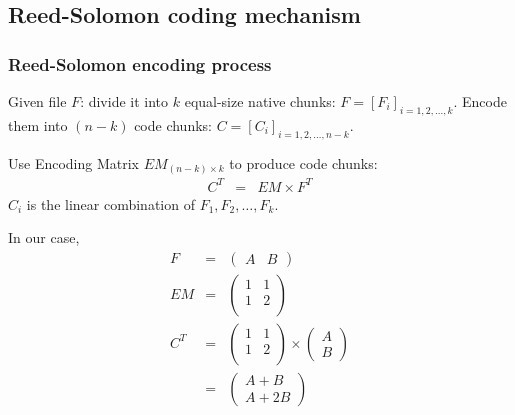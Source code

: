 \documentclass[slidestop,compress,mathserif]{beamer}
\begin{document}
\subsection{Reed-Solomon coding mechanism}
\begin{frame}[options]
\frametitle{Reed-Solomon encoding process}
{

%

Given file $F$:
divide it into $k$ equal-size native chunks: 
$F = [F_{i}]_{i=1,2,\dots,k}$.
Encode them into $(n-k)$ code chunks: 
$C = [C_{i}]_{i=1,2,\dots,n-k}$.

Use Encoding Matrix $EM_{(n-k) \times k}$ to produce code chunks:
\begin{displaymath}
\begin{array}{rcl}
C^{T} &=& EM \times F^{T} 
\end{array}
\end{displaymath}
$C_{i}$ is the linear combination of $F_{1}, F_{2}, \dots, F_{k}$.
}

{
In our case,
\begin{displaymath}
\begin{array}{rcl}
F &=& \begin{pmatrix} A & B \end{pmatrix} \\
EM &=& 	\begin{pmatrix}
		  1 & 1 \\
		  1 & 2 \\
		\end{pmatrix} \\
C^{T} &=& \begin{pmatrix} 1 & 1 \\  1 & 2 \\ \end{pmatrix} \times \begin{pmatrix} A \\ B \end{pmatrix} \\
&=& \begin{pmatrix} A+B \\ A+2B \end{pmatrix}
\end{array}
\end{displaymath}
}


\end{frame}
\end{document}

